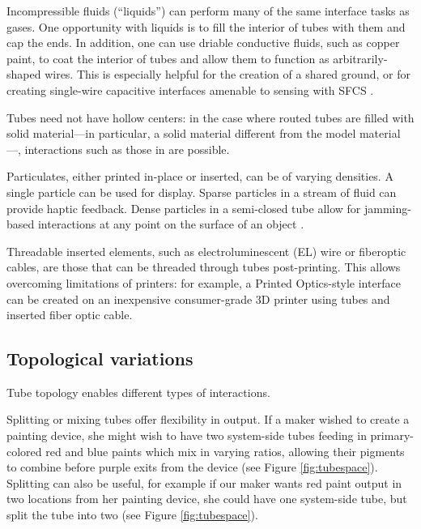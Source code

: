 Incompressible fluids (``liquids'') can perform many of the same interface tasks as gases.  One opportunity with liquids is to fill the interior of tubes with them and cap the ends.  In addition, one can use driable conductive fluids, such as copper paint, to coat the interior of tubes and allow them to function as arbitrarily-shaped wires.  This is especially helpful for the creation of a shared ground, or for creating single-wire capacitive interfaces amenable to sensing with SFCS \cite{Sato-touche}.

Tubes need not have hollow centers: in the case where routed tubes are filled with solid material---in particular, a solid material different from the model material---, interactions such as those in \cite{Willis-printedoptics} are possible.

Particulates, either printed in-place or inserted, can be of varying densities.  A single particle can be used for display.  Sparse particles in a stream of fluid can provide haptic feedback.  Dense particles in a semi-closed tube allow for jamming-based interactions at any point on the surface of an object \cite{Follmer-jamming}.

Threadable inserted elements, such as electroluminescent (EL) wire or fiberoptic cables, are those that can be threaded through tubes post-printing.  This allows overcoming limitations of printers: for example, a Printed Optics-style interface can be created on an inexpensive consumer-grade 3D printer using tubes and inserted fiber optic cable.

\subsection{Topological variations}

Tube topology enables different types of interactions. 

Splitting or mixing tubes offer flexibility in output.  If a maker wished to create a painting device, she might wish to have two system-side tubes feeding in primary-colored red and blue paints which mix in varying ratios, allowing their pigments to combine before purple exits from the device (see Figure \ref{fig:tubespace}).  Splitting can also be useful, for example if our maker wants red paint output in two locations from her painting device, she could have one system-side tube, but split the tube into two (see Figure \ref{fig:tubespace}). 

